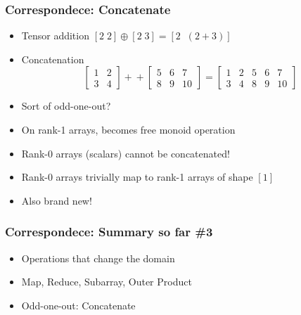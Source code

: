 \documentclass[xetex,mathserif,serif]{beamer}
\begin{document}
\begin{frame}
  \frametitle{Correspondece: Concatenate}
  \pause
  \begin{itemize}[<+->]
    \item Tensor addition \([2\;2] \oplus [2\;3] = [2\;\;(2+3)]\)
    \item Concatenation
      \[
        \begin{bmatrix} 1 & 2 \\ 3 & 4 \end{bmatrix} +\!\!\!+
        \begin{bmatrix} 5 & 6 & 7 \\ 8 & 9 & 10 \end{bmatrix}
        = \begin{bmatrix}
          1 & 2 & 5 & 6 & 7 \\
          3 & 4 & 8 & 9 & 10
        \end{bmatrix}
      \]
    \item Sort of odd-one-out?
    \item On rank-1 arrays, becomes free monoid operation
    \item Rank-0 arrays (scalars) cannot be concatenated!
    \item Rank-0 arrays trivially map to rank-1 arrays of shape \([1]\)
    \item Also brand new!
  \end{itemize}
\end{frame}

\begin{frame}
  \frametitle{Correspondece: Summary so far \#3}
  \pause
  \begin{itemize}[<+->]
    \item Operations that change the domain
    \item Map, Reduce, Subarray, Outer Product
    \item Odd-one-out: Concatenate
  \end{itemize}
\end{frame}
\end{document}
